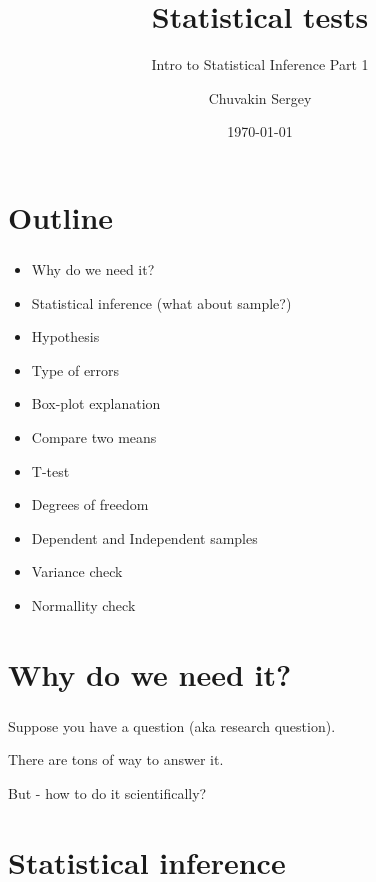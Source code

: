 \documentclass[t, 11pt]{beamer}
\title {Statistical tests}
\subtitle{Intro to Statistical Inference Part 1}
\author{Chuvakin Sergey}
\date{\today}
\institute[<<Anthropology>>]{<<School of Advanced Studies>>}
\newcommand\Warning{%
	\makebox[1.4em][c]{%
		\makebox[0pt][c]{\raisebox{.1em}{\small!}}%
		\makebox[0pt][c]{\color{red}\Large$\bigtriangleup$}}}%
\begin{document}
	
	\frame[plain]{\titlepage}		
	
	\section{Outline}
	
		\begin{frame} 
			\frametitle{\insertsection} 
			\begin{itemize}
				\item Why do we need it?
				\item Statistical inference (what about sample?)
				\item Hypothesis 
				\item Type of errors
				\item Box-plot explanation
				\item Compare two means 
				\item T-test
				\item Degrees of freedom
				\item Dependent and Independent samples
				\item Variance check
				\item Normallity check 
				
			\end{itemize}
\end{frame}
	
	\section{Why do we need it?}
	
	\begin{frame}
		\frametitle{\insertsection} 
		\framesubtitle{\insertsubsection} 
		Suppose you have a question (aka research question). 
		
		There are tons of way to answer it. 
		
		\vspace{1cm}
		
		\Warning But - how to do it scientifically?
		
	\end{frame}		

	\section{Statistical inference}
\end{document}
